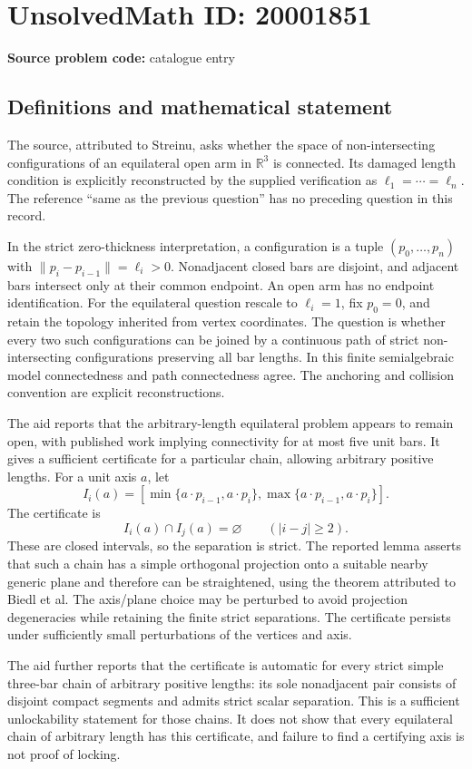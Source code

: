 \documentclass[11pt]{article}
\begin{document}
\section*{UnsolvedMath ID: 20001851}
\textbf{Source problem code:} catalogue entry
\subsection{Definitions and mathematical statement}
The source, attributed to Streinu, asks whether the space of non-intersecting configurations of an equilateral open arm in \(\mathbb R^3\) is connected. Its damaged length condition is explicitly reconstructed by the supplied verification as \(\ell_1=\cdots=\ell_n\). The reference ``same as the previous question'' has no preceding question in this record.

In the strict zero-thickness interpretation, a configuration is a tuple \((p_0,\ldots,p_n)\) with \(\|p_i-p_{i-1}\|=\ell_i>0\). Nonadjacent closed bars are disjoint, and adjacent bars intersect only at their common endpoint. An open arm has no endpoint identification. For the equilateral question rescale to \(\ell_i=1\), fix \(p_0=0\), and retain the topology inherited from vertex coordinates. The question is whether every two such configurations can be joined by a continuous path of strict non-intersecting configurations preserving all bar lengths. In this finite semialgebraic model connectedness and path connectedness agree. The anchoring and collision convention are explicit reconstructions.

The aid reports that the arbitrary-length equilateral problem appears to remain open, with published work implying connectivity for at most five unit bars. It gives a sufficient certificate for a particular chain, allowing arbitrary positive lengths. For a unit axis \(a\), let
\[
 I_i(a)=\left[\min\{a\cdot p_{i-1},a\cdot p_i\},
                  \max\{a\cdot p_{i-1},a\cdot p_i\}\right].
\]
The certificate is
\[
 I_i(a)\cap I_j(a)=\varnothing\qquad(|i-j|\geq2).
\]
These are closed intervals, so the separation is strict. The reported lemma asserts that such a chain has a simple orthogonal projection onto a suitable nearby generic plane and therefore can be straightened, using the theorem attributed to Biedl et al. The axis/plane choice may be perturbed to avoid projection degeneracies while retaining the finite strict separations. The certificate persists under sufficiently small perturbations of the vertices and axis.

The aid further reports that the certificate is automatic for every strict simple three-bar chain of arbitrary positive lengths: its sole nonadjacent pair consists of disjoint compact segments and admits strict scalar separation. This is a sufficient unlockability statement for those chains. It does not show that every equilateral chain of arbitrary length has this certificate, and failure to find a certifying axis is not proof of locking.
\end{document}
